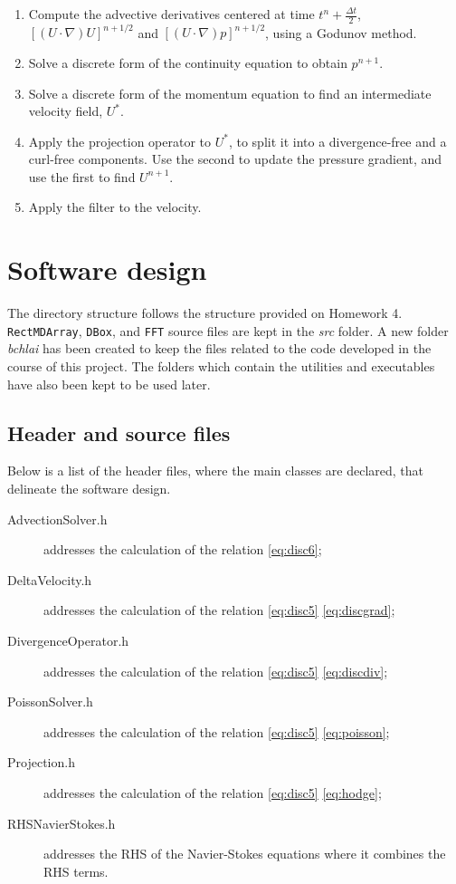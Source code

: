 \documentclass{article}
\begin{document}
\begin{enumerate}
	\item Compute the advective derivatives centered at time $t^n + \frac{\Delta t}{2}$, $\left[ (U \cdot \nabla) U \right]^{n + 1/2}$ and $\left[ (U \cdot \nabla) p \right]^{n + 1/2}$, using a Godunov method.
	\item Solve a discrete form of the continuity equation to obtain $p^{n + 1}$.
	\item Solve a discrete form of the momentum equation to find an intermediate velocity field, $U^*$.
	\item Apply the projection operator to $U^*$, to split it into a divergence-free and a curl-free components. Use the second to update the pressure gradient, and use the first to find $U^{n + 1}$.
	\item Apply the filter to the velocity.
\end{enumerate}

\section{Software design}

The directory structure follows the structure provided on Homework 4. \texttt{RectMDArray}, \texttt{DBox}, and \texttt{FFT} source files are kept in the \textit{src} folder. A new folder \textit{bchlai} has been created to keep the files related to the code developed in the course of this project. The folders which contain the utilities and executables have also been kept to be used later.

\subsection{Header and source files}

Below is a list of the header files, where the main classes are declared, that delineate the software design.
\begin{description}
	\item[AdvectionSolver.h] addresses the calculation of the relation \eqref{eq:disc6};
	\item[DeltaVelocity.h] addresses the calculation of the relation \eqref{eq:disc5} \eqref{eq:discgrad};
	\item[DivergenceOperator.h] addresses the calculation of the relation \eqref{eq:disc5} \eqref{eq:discdiv};
	\item[PoissonSolver.h] addresses the calculation of  the relation \eqref{eq:disc5} \eqref{eq:poisson};
	\item [Projection.h] addresses the calculation of the relation \eqref{eq:disc5} \eqref{eq:hodge};
	\item [RHSNavierStokes.h] addresses the RHS of the Navier-Stokes equations where it combines the RHS terms.
\end{description}
\end{document}
